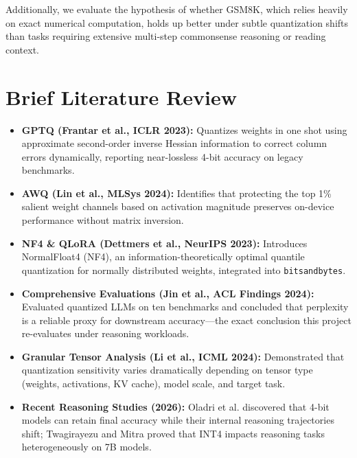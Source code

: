\documentclass[12pt, a4paper]{article}
\begin{document}
Additionally, we evaluate the hypothesis of whether GSM8K, which relies heavily on exact numerical computation, holds up better under subtle quantization shifts than tasks requiring extensive multi-step commonsense reasoning or reading context.

\section{Brief Literature Review}

\begin{itemize}[leftmargin=*]
    \item \textbf{GPTQ (Frantar et al., ICLR 2023):} Quantizes weights in one shot using approximate second-order inverse Hessian information to correct column errors dynamically, reporting near-lossless 4-bit accuracy on legacy benchmarks.
    \item \textbf{AWQ (Lin et al., MLSys 2024):} Identifies that protecting the top 1\% salient weight channels based on activation magnitude preserves on-device performance without matrix inversion.
    \item \textbf{NF4 \& QLoRA (Dettmers et al., NeurIPS 2023):} Introduces NormalFloat4 (NF4), an information-theoretically optimal quantile quantization for normally distributed weights, integrated into \texttt{bitsandbytes}.
    \item \textbf{Comprehensive Evaluations (Jin et al., ACL Findings 2024):} Evaluated quantized LLMs on ten benchmarks and concluded that perplexity is a reliable proxy for downstream accuracy---the exact conclusion this project re-evaluates under reasoning workloads.
    \item \textbf{Granular Tensor Analysis (Li et al., ICML 2024):} Demonstrated that quantization sensitivity varies dramatically depending on tensor type (weights, activations, KV cache), model scale, and target task.
    \item \textbf{Recent Reasoning Studies (2026):} Oladri et al. discovered that 4-bit models can retain final accuracy while their internal reasoning trajectories shift; Twagirayezu and Mitra proved that INT4 impacts reasoning tasks heterogeneously on 7B models.
\end{itemize}

\end{document}
